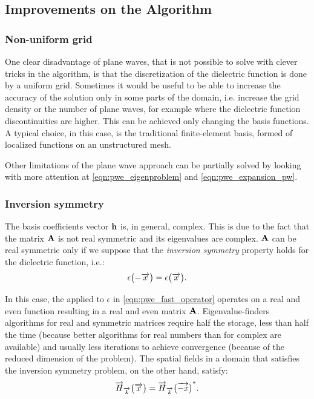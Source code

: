 \subsection{Improvements on the Algorithm}

\subsubsection{Non-uniform grid}

One clear disadvantage of plane waves, that is not possible to solve
with clever tricks in the algorithm, is that the discretization of the
dielectric function is done by a uniform grid. Sometimes it would be
useful to be able to increase the accuracy of the solution only in
some parts of the domain, i.e. increase the grid density or the number
of plane waves, for example where the dielectric function
discontinuities are higher. This can be achieved only changing the
basis functions. A typical choice, in this case, is the traditional
finite-element basis, formed of localized functions on an unstructured
mesh.

Other limitations of the plane wave approach can be partially solved
by looking with more attention at \ref{eqn:pwe_eigenproblem} and
\ref{eqn:pwe_expansion_pw}.

\subsubsection{Inversion symmetry}

The basis coefficients vector $\mathbf{h}$ is, in general,
complex. This is due to the fact that the matrix $\mathbf{A}$
is not real symmetric and its eigenvalues are complex. $\mathbf{A}$
can be real symmetric only if we suppose that the \emph{inversion
symmetry} property holds for the dielectric function, i.e.:
\begin{equation*}
  \epsilon\bigl(-\overrightarrow{x}\bigr) = \epsilon\bigl(\overrightarrow{x}\bigr).
\end{equation*}

In this case, the \FFT applied to $\epsilon$ in
\eqref{eqn:pwe_fast_operator} operates on a real and even function
resulting in a real and even matrix $\mathbf{A}$. Eigenvalue-finders
algorithms for real and symmetric matrices
require half the storage, less than half the time (because better algorithms
for real numbers than for complex are available) and usually less iterations to achieve
convergence (because of the reduced dimension of the problem). The spatial fields in
a domain that satisfies the inversion symmetry problem, on the other hand, satisfy:
\begin{equation*}
  \overrightarrow{H}_{\overrightarrow{k}}\bigl(\overrightarrow{x}\bigr) = {{\overrightarrow{H}_{\overrightarrow{k}}\bigl(\overrightarrow{-x}\bigr)}^*}.
\end{equation*}

